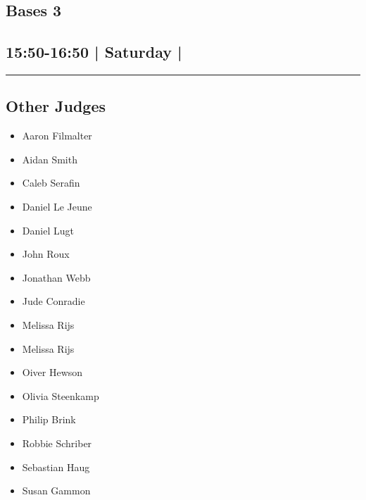 \documentclass[10pt, A5]{article}
\begin{document}
		\begin{framed}
			\begin{minipage}{\textwidth}

			\setcounter{section}{54}
							\section{Bases 3}
						
			\subsection*{15:50-16:50 | Saturday | }

			\vspace{0.25cm}
			\hrule
			\vspace{0.25cm}


			\subsection*{Other Judges}
							

				\begin{multicols}{2}

			\begin{itemize}
											\item Aaron Filmalter
											\item Aidan Smith
											\item Caleb Serafin
											\item Daniel Le Jeune
											\item Daniel Lugt
											\item John Roux
											\item Jonathan Webb
											\item Jude Conradie
											\item Melissa Rijs
								\end{itemize}

			\vfill\null
			\columnbreak

			\begin{itemize}
											\item Melissa Rijs
											\item Oiver Hewson
											\item Olivia Steenkamp
											\item Philip Brink
											\item Robbie Schriber
											\item Sebastian Haug
											\item Susan Gammon
								\end{itemize}


\end{multicols}
\end{minipage}
\end{framed}
\end{document}
